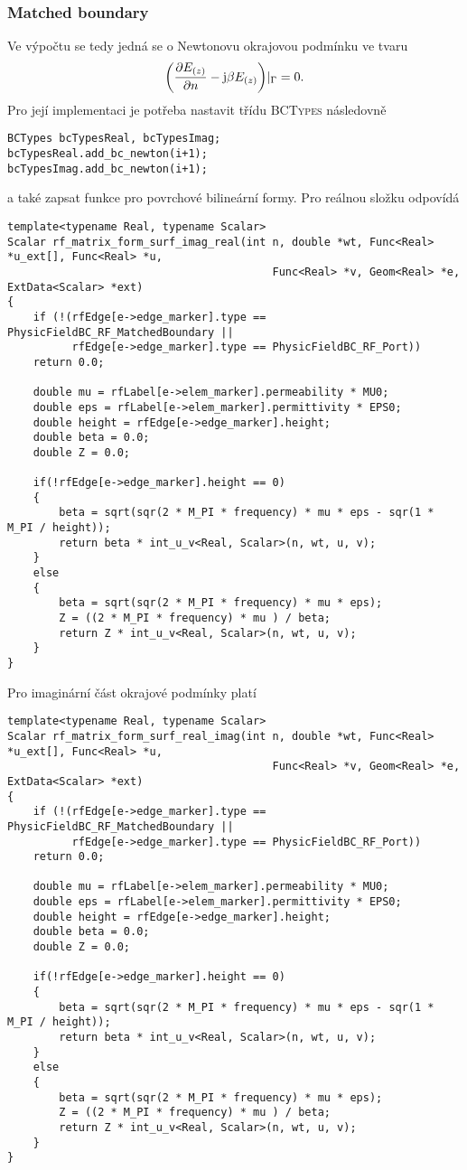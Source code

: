 \subsubsection*{Matched boundary}
Ve výpočtu se tedy jedná se o Newtonovu okrajovou podmínku ve tvaru
\begin{equation}
	\bigg(\frac{\partial E_{(z)}}{\partial n} - \mathrm{j}\beta E_{(z)}\bigg)|_{\Gamma} = 0.
	\label{rce:sim_BC_matched_boundary}
\end{equation}
Pro její implementaci je potřeba nastavit třídu \textsc{BCTypes} následovně
\begin{verbatim}
BCTypes bcTypesReal, bcTypesImag;
bcTypesReal.add_bc_newton(i+1);
bcTypesImag.add_bc_newton(i+1);              
\end{verbatim}
a také zapsat funkce pro povrchové bilineární formy. Pro reálnou složku odpovídá 
\begin{verbatim}
template<typename Real, typename Scalar>
Scalar rf_matrix_form_surf_imag_real(int n, double *wt, Func<Real> *u_ext[], Func<Real> *u,
                                         Func<Real> *v, Geom<Real> *e, ExtData<Scalar> *ext)
{
    if (!(rfEdge[e->edge_marker].type == PhysicFieldBC_RF_MatchedBoundary ||
          rfEdge[e->edge_marker].type == PhysicFieldBC_RF_Port))
    return 0.0;

    double mu = rfLabel[e->elem_marker].permeability * MU0;
    double eps = rfLabel[e->elem_marker].permittivity * EPS0;
    double height = rfEdge[e->edge_marker].height;
    double beta = 0.0;
    double Z = 0.0;

    if(!rfEdge[e->edge_marker].height == 0)
    {
        beta = sqrt(sqr(2 * M_PI * frequency) * mu * eps - sqr(1 * M_PI / height));
        return beta * int_u_v<Real, Scalar>(n, wt, u, v);
    }
    else
    {
        beta = sqrt(sqr(2 * M_PI * frequency) * mu * eps);
        Z = ((2 * M_PI * frequency) * mu ) / beta;
        return Z * int_u_v<Real, Scalar>(n, wt, u, v);
    }
}
\end{verbatim}
Pro imaginární část okrajové podmínky platí
\begin{verbatim}
template<typename Real, typename Scalar>
Scalar rf_matrix_form_surf_real_imag(int n, double *wt, Func<Real> *u_ext[], Func<Real> *u,
                                         Func<Real> *v, Geom<Real> *e, ExtData<Scalar> *ext)
{
    if (!(rfEdge[e->edge_marker].type == PhysicFieldBC_RF_MatchedBoundary ||
          rfEdge[e->edge_marker].type == PhysicFieldBC_RF_Port))
    return 0.0;

    double mu = rfLabel[e->elem_marker].permeability * MU0;
    double eps = rfLabel[e->elem_marker].permittivity * EPS0;
    double height = rfEdge[e->edge_marker].height;
    double beta = 0.0;
    double Z = 0.0;

    if(!rfEdge[e->edge_marker].height == 0)
    {
        beta = sqrt(sqr(2 * M_PI * frequency) * mu * eps - sqr(1 * M_PI / height));
        return beta * int_u_v<Real, Scalar>(n, wt, u, v);
    }
    else
    {
        beta = sqrt(sqr(2 * M_PI * frequency) * mu * eps);
        Z = ((2 * M_PI * frequency) * mu ) / beta;
        return Z * int_u_v<Real, Scalar>(n, wt, u, v);
    }
}
\end{verbatim}
